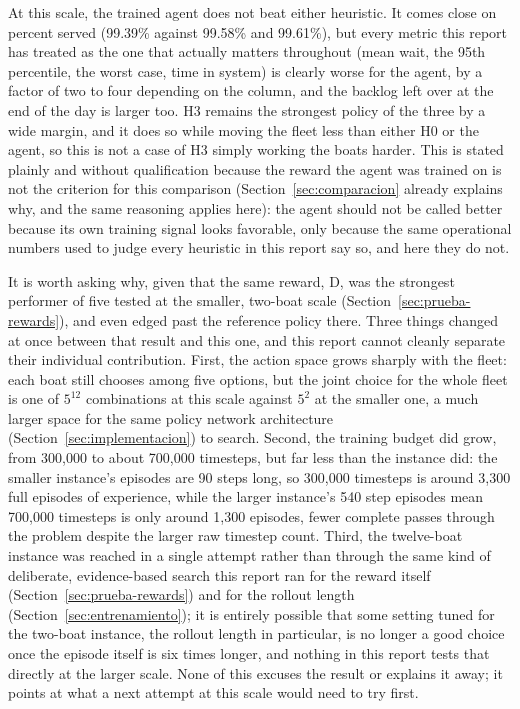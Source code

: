 \documentclass[11pt,a4paper]{article}
\begin{document}
At this scale, the trained agent does not beat either heuristic. It comes close on percent served (99.39\% against 99.58\% and 99.61\%), but every metric this report has treated as the one that actually matters throughout (mean wait, the 95th percentile, the worst case, time in system) is clearly worse for the agent, by a factor of two to four depending on the column, and the backlog left over at the end of the day is larger too. H3 remains the strongest policy of the three by a wide margin, and it does so while moving the fleet less than either H0 or the agent, so this is not a case of H3 simply working the boats harder. This is stated plainly and without qualification because the reward the agent was trained on is not the criterion for this comparison (Section~\ref{sec:comparacion} already explains why, and the same reasoning applies here): the agent should not be called better because its own training signal looks favorable, only because the same operational numbers used to judge every heuristic in this report say so, and here they do not.

It is worth asking why, given that the same reward, D, was the strongest performer of five tested at the smaller, two-boat scale (Section~\ref{sec:prueba-rewards}), and even edged past the reference policy there. Three things changed at once between that result and this one, and this report cannot cleanly separate their individual contribution. First, the action space grows sharply with the fleet: each boat still chooses among five options, but the joint choice for the whole fleet is one of $5^{12}$ combinations at this scale against $5^{2}$ at the smaller one, a much larger space for the same policy network architecture (Section~\ref{sec:implementacion}) to search. Second, the training budget did grow, from 300{,}000 to about 700{,}000 timesteps, but far less than the instance did: the smaller instance's episodes are 90 steps long, so 300{,}000 timesteps is around 3{,}300 full episodes of experience, while the larger instance's 540 step episodes mean 700{,}000 timesteps is only around 1{,}300 episodes, fewer complete passes through the problem despite the larger raw timestep count. Third, the twelve-boat instance was reached in a single attempt rather than through the same kind of deliberate, evidence-based search this report ran for the reward itself (Section~\ref{sec:prueba-rewards}) and for the rollout length (Section~\ref{sec:entrenamiento}); it is entirely possible that some setting tuned for the two-boat instance, the rollout length in particular, is no longer a good choice once the episode itself is six times longer, and nothing in this report tests that directly at the larger scale. None of this excuses the result or explains it away; it points at what a next attempt at this scale would need to try first.
\end{document}
